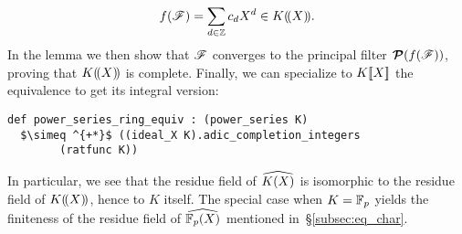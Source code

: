 \documentclass[sigplan,10pt, nonacm, review]{acmart}
\begin{document}
\[
f(\filter)=\sum_{d\in\ZZ} c_dX^d\in\laurentseries[K].
\]
In the lemma \href{https://github.com/LCFT-Lean/local_fields/blob/76ad487d09babdb0018f394a5634526637ee014a/src/laurent_series_equiv_adic_completion.lean#L625}{\extlink} we then show that $\filter$ converges to the principal filter $\princfilter(f(\filter))$, proving that $\laurentseries[K]$ is complete. Finally, we can specialize to $\powerseries[K]$ the equivalence 
to get its integral version:\href{https://github.com/LCFT-Lean/local_fields/blob/76ad487d09babdb0018f394a5634526637ee014a/src/laurent_series_equiv_adic_completion.lean#L978}{\extlink}
\begin{lstlisting}[caption={The isomorphism between power series and the unit ball in the completion of rational functions.}, label={code:iso_ps}]
def power_series_ring_equiv : (power_series K) 
  $\simeq ^{+*}$ ((ideal_X K).adic_completion_integers 
        (ratfunc K))
\end{lstlisting}
In particular, we see that the residue field of $\FpXCompl[K]$ is isomorphic to the residue field of $\laurentseries[K]$, hence to $K$ itself. The special case when $K=\FF$ yields the finiteness of the residue field of $\FpXCompl$ mentioned in~\S\ref{subsec:eq_char}.
\end{document}
